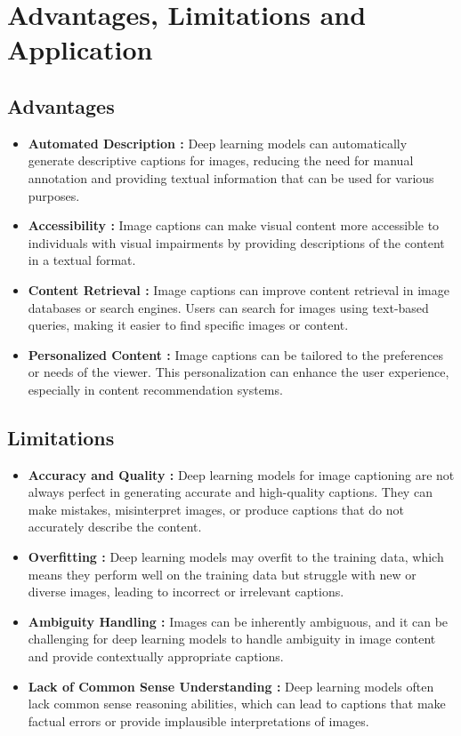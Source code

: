 \documentclass[oneside,a4paper,12pt]{report}
\begin{document}
\chapter{Advantages, Limitations and Application}
\section{Advantages}
\begin{itemize}
\item \textbf{Automated Description : }Deep learning models can automatically generate descriptive captions for images, reducing the need for manual annotation and providing textual information that can be used for various purposes.

\item \textbf{Accessibility :} Image captions can make visual content more accessible to individuals with visual impairments by providing descriptions of the content in a textual format.

\item \textbf{Content Retrieval :} Image captions can improve content retrieval in image databases or search engines. Users can search for images using text-based queries, making it easier to find specific images or content.

\item \textbf{Personalized Content : }Image captions can be tailored to the preferences or needs of the viewer. This personalization can enhance the user experience, especially in content recommendation systems.
\end{itemize}
\section{Limitations}
\begin{itemize}
\item \textbf{Accuracy and Quality : }Deep learning models for image captioning are not always perfect in generating accurate and high-quality captions. They can make mistakes, misinterpret images, or produce captions that do not accurately describe the content.

\item \textbf{Overfitting :} Deep learning models may overfit to the training data, which means they perform well on the training data but struggle with new or diverse images, leading to incorrect or irrelevant captions.
\item \textbf{Ambiguity Handling :} Images can be inherently ambiguous, and it can be challenging for deep learning models to handle ambiguity in image content and provide contextually appropriate captions.
\item \textbf{Lack of Common Sense Understanding :} Deep learning models often lack common sense reasoning abilities, which can lead to captions that make factual errors or provide implausible interpretations of images.
\end{itemize}
\end{document}
